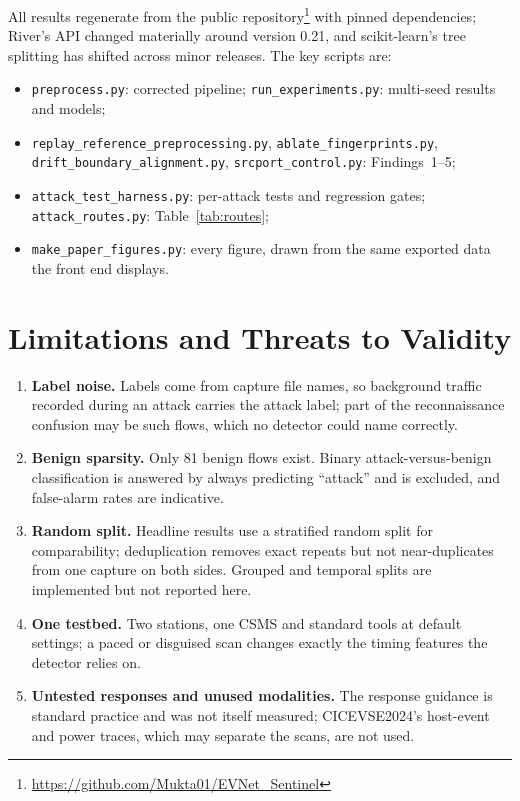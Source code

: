 \documentclass[conference]{IEEEtran}
\newcommand{\col}[1]{\texttt{\small #1}}
\begin{document}
All results regenerate from the public repository\footnote{\url{https://github.com/Mukta01/EVNet\_Sentinel}} with pinned dependencies; River's API changed materially around version 0.21, and scikit-learn's tree splitting has shifted across minor releases. The key scripts are:
\begin{itemize}
    \item \col{preprocess.py}: corrected pipeline; \col{run\_experiments.py}: multi-seed results and models;
    \item \col{replay\_reference\_preprocessing.py}, \col{ablate\_fingerprints.py}, \col{drift\_boundary\_alignment.py}, \col{srcport\_control.py}: Findings~1--5;
    \item \col{attack\_test\_harness.py}: per-attack tests and regression gates; \col{attack\_routes.py}: Table~\ref{tab:routes};
    \item \col{make\_paper\_figures.py}: every figure, drawn from the same exported data the front end displays.
\end{itemize}

\section{Limitations and Threats to Validity}

\begin{enumerate}
    \item \textbf{Label noise.} Labels come from capture file names, so background traffic recorded during an attack carries the attack label; part of the reconnaissance confusion may be such flows, which no detector could name correctly.
    \item \textbf{Benign sparsity.} Only 81 benign flows exist. Binary attack-versus-benign classification is answered by always predicting ``attack'' and is excluded, and false-alarm rates are indicative.
    \item \textbf{Random split.} Headline results use a stratified random split for comparability; deduplication removes exact repeats but not near-duplicates from one capture on both sides. Grouped and temporal splits are implemented but not reported here.
    \item \textbf{One testbed.} Two stations, one CSMS and standard tools at default settings; a paced or disguised scan changes exactly the timing features the detector relies on.
    \item \textbf{Untested responses and unused modalities.} The response guidance is standard practice and was not itself measured; CICEVSE2024's host-event and power traces, which may separate the scans, are not used.
\end{enumerate}
\end{document}
